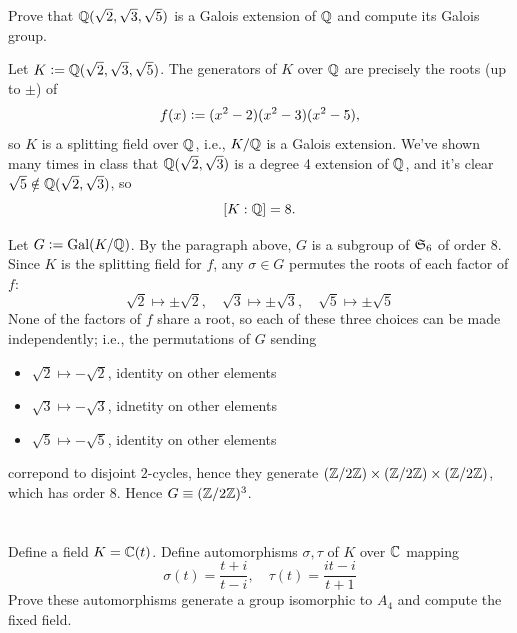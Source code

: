 \documentclass[12pt]{article}
\begin{document}
\section{}
Prove that $\mathbb{Q}(\sqrt{2}, \sqrt{3}, \sqrt{5})$ is a Galois extension of $\mathbb{Q}$ and compute its Galois group. 

\noindent \dotfill

Let $K \vcentcolon= \mathbb{Q}(\sqrt{2}, \sqrt{3}, \sqrt{5})$. 
The generators of $K$ over $\mathbb{Q}$ are precisely the roots (up to $\pm$) of 
$$f(x) \vcentcolon= (x^2 - 2)(x^2 - 3)(x^2 - 5),$$
so $K$ is a splitting field over $\mathbb{Q}$, 
i.e., $K / \mathbb{Q}$ is a Galois extension. 
We've shown many times in class that $\mathbb{Q}(\sqrt{2}, \sqrt{3})$ is a degree 4 extension of $\mathbb{Q}$, and it's clear $\sqrt{5} \notin \mathbb{Q}(\sqrt{2}, \sqrt{3})$, so 
$$[K : \mathbb{Q}] = 8.$$

Let $G \vcentcolon= \text{Gal}(K / \mathbb{Q})$. 
By the paragraph above, $G$ is a subgroup of $\mathfrak{S}_{6}$ of order 8. 
Since $K$ is the splitting field for $f$, any $\sigma \in G$ permutes the roots of each factor of $f$: 
$$\sqrt{2} \mapsto \pm \sqrt{2}, \quad \sqrt{3} \mapsto \pm \sqrt{3}, \quad  \sqrt{5} \mapsto \pm \sqrt{5}$$
None of the factors of $f$ share a root, so each of these three choices can be made independently; 
i.e., the permutations of $G$ sending 
\begin{itemize}
  \item $\sqrt{2} \mapsto -\sqrt{2}$, identity on other elements 
  \item $\sqrt{3} \mapsto -\sqrt{3}$, idnetity on other elements 
  \item $\sqrt{5} \mapsto -\sqrt{5}$, identity on other elements 
\end{itemize}
correpond to disjoint $2$-cycles, hence they generate $(\mathbb{Z} / 2\mathbb{Z}) \times (\mathbb{Z} / 2\mathbb{Z}) \times (\mathbb{Z} / 2\mathbb{Z})$, which has order 8. 
Hence $G \equiv (\Z / 2\Z)^3$.

\section{}
Define a field $K = \mathbb{C}(t)$. 
Define automorphisms $\sigma, \tau$ of $K$ over $\mathbb{C}$ mapping 
$$\sigma(t) = \frac{t + i}{t - i}, \quad \tau(t) = \frac{it - i}{t + 1}$$
Prove these automorphisms generate a group isomorphic to $A_4$ and compute the fixed field. 

\noindent \dotfill 
\end{document}
